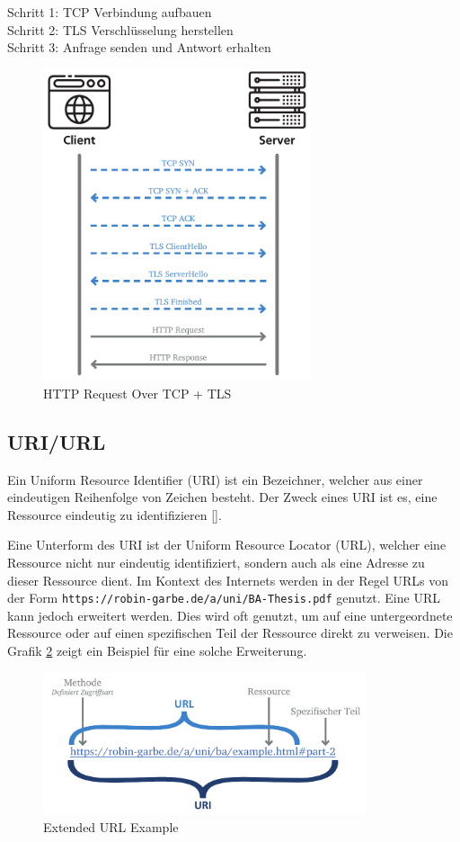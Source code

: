 Schritt 1: TCP Verbindung aufbauen\\
Schritt 2: TLS Verschlüsselung herstellen\\
Schritt 3: Anfrage senden und Antwort erhalten
%
\begin{figure}[htbp]
	\centering\includegraphics[width=0.7\textwidth]{images/03/HTTPS.pdf}
    \caption{HTTP Request Over TCP + TLS}
    \label{fig:HTTPS}
\end{figure}

\subsection{URI/URL}
\label{subsec:http_uri}

Ein Uniform Resource Identifier (URI) ist ein Bezeichner, welcher aus einer eindeutigen Reihenfolge von Zeichen besteht. 
Der Zweck eines URI ist es, eine Ressource eindeutig zu identifizieren [\cite{uri}].

Eine Unterform des URI ist der Uniform Resource Locator (URL), welcher eine Ressource nicht nur eindeutig identifiziert, sondern auch als eine Adresse zu dieser Ressource dient. Im Kontext des Internets werden in der Regel URLs von der Form \verb|https://robin-garbe.de/a/uni/BA-Thesis.pdf| genutzt. Eine URL kann jedoch erweitert werden. Dies wird oft genutzt, um auf eine untergeordnete Ressource oder auf einen spezifischen Teil der Ressource direkt zu verweisen. Die Grafik \ref{fig:URI} zeigt ein Beispiel für eine solche Erweiterung.
%
\begin{figure}[htbp]
	\centering\includegraphics[width=0.85\textwidth]{images/03/URI.pdf}
    \caption{Extended URL Example}
    \label{fig:URI}
\end{figure}
